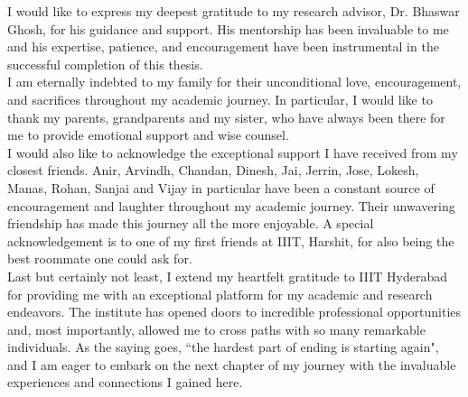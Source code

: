 I would like to express my deepest gratitude to my research advisor, Dr. Bhaswar Ghosh, for his 
guidance and support. His mentorship has been invaluable to me and his expertise, patience, and 
encouragement have been instrumental in the successful completion of this thesis. \\

I am eternally indebted to my family for their unconditional love, encouragement, and sacrifices 
throughout my academic journey. In particular, I would like to thank my parents, grandparents and my sister, 
who have always been there for me to provide emotional support and wise counsel. \\

I would also like to acknowledge the exceptional support I have received from my closest friends. 
Anir, Arvindh, Chandan, Dinesh, Jai, Jerrin, Jose, Lokesh, Manas, Rohan, Sanjai and Vijay in particular
have been a constant source of encouragement and laughter throughout my academic journey. 
Their unwavering friendship has made this journey all the more enjoyable. A special acknowledgement is to 
one of my first friends at IIIT, Harshit, for also being the best roommate one could ask for. \\

Last but certainly not least, I extend my heartfelt gratitude to IIIT Hyderabad for providing me with an 
exceptional platform for my academic and research endeavors. The institute has opened doors to incredible 
professional opportunities and, most importantly, allowed me to cross paths with so many remarkable individuals. 
As the saying goes, ``the hardest part of ending is starting again", and I am eager to embark on the next 
chapter of my journey with the invaluable experiences and connections I gained here.
